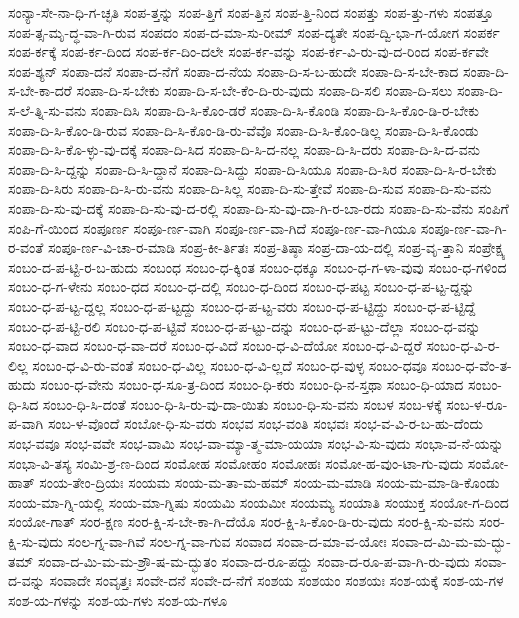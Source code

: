 {ಸಂನ್ಯಾ-ಸೇ-ನಾ-ಧಿ-ಗ-ಚ್ಛತಿ
ಸಂಪ-ತ್ತನ್ನು
ಸಂಪ-ತ್ತಿಗೆ
ಸಂಪ-ತ್ತಿನ
ಸಂಪ-ತ್ತಿ-ನಿಂದ
ಸಂಪತ್ತು
ಸಂಪ-ತ್ತು-ಗಳು
ಸಂಪತ್ತೂ
ಸಂಪ-ತ್ಸ-ಮೃ-ದ್ಧ-ವಾ-ಗಿ-ರುವ
ಸಂಪದಂ
ಸಂಪ-ದ-ಮಾ-ಸು-ರೀಮ್
ಸಂಪ-ದ್ಯತೇ
ಸಂಪ-ದ್ವಿ-ಭಾ-ಗ-ಯೋಗ
ಸಂಪರ್ಕ
ಸಂಪ-ರ್ಕಕ್ಕೆ
ಸಂಪ-ರ್ಕ-ದಿಂದ
ಸಂಪ-ರ್ಕ-ದಿಂ-ದಲೇ
ಸಂಪ-ರ್ಕ-ವನ್ನು
ಸಂಪ-ರ್ಕ-ವಿ-ರು-ವು-ದ-ರಿಂದ
ಸಂಪ-ರ್ಕವೇ
ಸಂಪ-ಶ್ಯನ್
ಸಂಪಾ-ದನೆ
ಸಂಪಾ-ದ-ನೆಗೆ
ಸಂಪಾ-ದ-ನೆಯ
ಸಂಪಾ-ದಿ-ಸ-ಬ-ಹುದೇ
ಸಂಪಾ-ದಿ-ಸ-ಬೇ-ಕಾದ
ಸಂಪಾ-ದಿ-ಸ-ಬೇ-ಕಾ-ದರೆ
ಸಂಪಾ-ದಿ-ಸ-ಬೇಕು
ಸಂಪಾ-ದಿ-ಸ-ಬೇ-ಕೆಂ-ದಿ-ರು-ವುದು
ಸಂಪಾ-ದಿ-ಸಲಿ
ಸಂಪಾ-ದಿ-ಸಲು
ಸಂಪಾ-ದಿ-ಸ-ಲೆ-ತ್ನಿ-ಸು-ವನು
ಸಂಪಾ-ದಿಸಿ
ಸಂಪಾ-ದಿ-ಸಿ-ಕೊಂ-ಡರೆ
ಸಂಪಾ-ದಿ-ಸಿ-ಕೊಂಡಿ
ಸಂಪಾ-ದಿ-ಸಿ-ಕೊಂ-ಡಿ-ರ-ಬೇಕು
ಸಂಪಾ-ದಿ-ಸಿ-ಕೊಂ-ಡಿ-ರುವ
ಸಂಪಾ-ದಿ-ಸಿ-ಕೊಂ-ಡಿ-ರು-ವೆವೊ
ಸಂಪಾ-ದಿ-ಸಿ-ಕೊಂ-ಡಿಲ್ಲ
ಸಂಪಾ-ದಿ-ಸಿ-ಕೊಂಡು
ಸಂಪಾ-ದಿ-ಸಿ-ಕೊ-ಳ್ಳು-ವು-ದಕ್ಕೆ
ಸಂಪಾ-ದಿ-ಸಿದ
ಸಂಪಾ-ದಿ-ಸಿ-ದ-ನಲ್ಲ
ಸಂಪಾ-ದಿ-ಸಿ-ದರು
ಸಂಪಾ-ದಿ-ಸಿ-ದ-ವನು
ಸಂಪಾ-ದಿ-ಸಿ-ದ್ದನ್ನು
ಸಂಪಾ-ದಿ-ಸಿ-ದ್ದಾನೆ
ಸಂಪಾ-ದಿ-ಸಿದ್ದು
ಸಂಪಾ-ದಿ-ಸಿಯೂ
ಸಂಪಾ-ದಿ-ಸಿರ
ಸಂಪಾ-ದಿ-ಸಿ-ರ-ಬೇಕು
ಸಂಪಾ-ದಿ-ಸಿರು
ಸಂಪಾ-ದಿ-ಸಿ-ರು-ವನು
ಸಂಪಾ-ದಿ-ಸಿಲ್ಲ
ಸಂಪಾ-ದಿ-ಸು-ತ್ತೇವೆ
ಸಂಪಾ-ದಿ-ಸುವ
ಸಂಪಾ-ದಿ-ಸು-ವನು
ಸಂಪಾ-ದಿ-ಸು-ವು-ದಕ್ಕೆ
ಸಂಪಾ-ದಿ-ಸು-ವು-ದ-ರಲ್ಲಿ
ಸಂಪಾ-ದಿ-ಸು-ವು-ದಾ-ಗಿ-ರ-ಬಾ-ರದು
ಸಂಪಾ-ದಿ-ಸು-ವೆನು
ಸಂಪಿಗೆ
ಸಂಪಿ-ಗೆ-ಯಿಂದ
ಸಂಪೂರ್ಣ
ಸಂಪೂ-ರ್ಣ-ವಾಗಿ
ಸಂಪೂ-ರ್ಣ-ವಾ-ಗಿದೆ
ಸಂಪೂ-ರ್ಣ-ವಾ-ಗಿಯೂ
ಸಂಪೂ-ರ್ಣ-ವಾ-ಗಿ-ರ-ವಂತೆ
ಸಂಪೂ-ರ್ಣ-ವಿ-ಚಾ-ರ-ಮಾಡಿ
ಸಂಪ್ರ-ಕೀ-ರ್ತಿತಃ
ಸಂಪ್ರ-ತಿಷ್ಠಾ
ಸಂಪ್ರ-ದಾ-ಯ-ದಲ್ಲಿ
ಸಂಪ್ರ-ವೃ-ತ್ತಾನಿ
ಸಂಪ್ರೇಕ್ಷ್ಯ
ಸಂಬಂ-ದ-ಪ-ಟ್ಟಿ-ರ-ಬ-ಹುದು
ಸಂಬಂಧ
ಸಂಬಂ-ಧ-ಕ್ಕಿಂತ
ಸಂಬಂ-ಧಕ್ಕೂ
ಸಂಬಂ-ಧ-ಗ-ಳಾ-ವುವು
ಸಂಬಂ-ಧ-ಗಳಿಂದ
ಸಂಬಂ-ಧ-ಗ-ಳೇನು
ಸಂಬಂ-ಧದ
ಸಂಬಂ-ಧ-ದಲ್ಲಿ
ಸಂಬಂ-ಧ-ದಿಂದ
ಸಂಬಂ-ಧ-ಪಟ್ಟ
ಸಂಬಂ-ಧ-ಪ-ಟ್ಟ-ದ್ದನ್ನು
ಸಂಬಂ-ಧ-ಪ-ಟ್ಟ-ದ್ದಲ್ಲ
ಸಂಬಂ-ಧ-ಪ-ಟ್ಟದ್ದು
ಸಂಬಂ-ಧ-ಪ-ಟ್ಟ-ವರು
ಸಂಬಂ-ಧ-ಪ-ಟ್ಟಿದ್ದು
ಸಂಬಂ-ಧ-ಪ-ಟ್ಟಿದ್ದೆ
ಸಂಬಂ-ಧ-ಪ-ಟ್ಟಿ-ರಲಿ
ಸಂಬಂ-ಧ-ಪ-ಟ್ಟಿವೆ
ಸಂಬಂ-ಧ-ಪ-ಟ್ಟು-ದನ್ನು
ಸಂಬಂ-ಧ-ಪ-ಟ್ಟು-ದೆಲ್ಲಾ
ಸಂಬಂ-ಧ-ವನ್ನು
ಸಂಬಂ-ಧ-ವಾದ
ಸಂಬಂ-ಧ-ವಾ-ದರೆ
ಸಂಬಂ-ಧ-ವಿದೆ
ಸಂಬಂ-ಧ-ವಿ-ದೆಯೋ
ಸಂಬಂ-ಧ-ವಿ-ದ್ದರೆ
ಸಂಬಂ-ಧ-ವಿ-ರ-ಲಿಲ್ಲ
ಸಂಬಂ-ಧ-ವಿ-ರು-ವಂತೆ
ಸಂಬಂ-ಧ-ವಿಲ್ಲ
ಸಂಬಂ-ಧ-ವಿ-ಲ್ಲದೆ
ಸಂಬಂ-ಧ-ವುಳ್ಳ
ಸಂಬಂ-ಧವೂ
ಸಂಬಂ-ಧ-ವೆಂ-ತ-ಹುದು
ಸಂಬಂ-ಧ-ವೇನು
ಸಂಬಂ-ಧ-ಸೂ-ತ್ರ-ದಿಂದ
ಸಂಬಂ-ಧಿ-ಕರು
ಸಂಬಂ-ಧಿ-ನ-ಸ್ತಥಾ
ಸಂಬಂ-ಧಿ-ಯಾದ
ಸಂಬಂ-ಧಿ-ಸಿದ
ಸಂಬಂ-ಧಿ-ಸಿ-ದಂತೆ
ಸಂಬಂ-ಧಿ-ಸಿ-ರು-ವು-ದಾ-ಯಿತು
ಸಂಬಂ-ಧಿ-ಸು-ವನು
ಸಂಬಳ
ಸಂಬ-ಳಕ್ಕೆ
ಸಂಬ-ಳ-ರೂ-ಪ-ವಾಗಿ
ಸಂಬ-ಳ-ವೊಂದೆ
ಸಂಬೋ-ಧಿ-ಸು-ವರು
ಸಂಭವ
ಸಂಭ-ವಂತಿ
ಸಂಭವಃ
ಸಂಭ-ವ-ವಿ-ರ-ಬ-ಹು-ದೆಂದು
ಸಂಭ-ವವೂ
ಸಂಭ-ವವೇ
ಸಂಭ-ವಾಮಿ
ಸಂಭ-ವಾ-ಮ್ಯಾ-ತ್ಮ-ಮಾ-ಯಯಾ
ಸಂಭ-ವಿ-ಸು-ವುದು
ಸಂಭಾ-ವ-ನೆ-ಯನ್ನು
ಸಂಭಾ-ವಿ-ತಸ್ಯ
ಸಂಮಿ-ಶ್ರ-ಣ-ದಿಂದ
ಸಂಮೋಹ
ಸಂಮೋಹಂ
ಸಂಮೋಹಃ
ಸಂಮೋ-ಹ-ವುಂ-ಟಾ-ಗು-ವುದು
ಸಂಮೋ-ಹಾತ್
ಸಂಯ-ತೇಂ-ದ್ರಿಯಃ
ಸಂಯಮ
ಸಂಯ-ಮ-ತಾ-ಮ-ಹಮ್
ಸಂಯ-ಮ-ಮಾಡಿ
ಸಂಯ-ಮ-ಮಾ-ಡಿ-ಕೊಂಡು
ಸಂಯ-ಮಾ-ಗ್ನಿ-ಯಲ್ಲಿ
ಸಂಯ-ಮಾ-ಗ್ನಿಷು
ಸಂಯಮಿ
ಸಂಯಮೀ
ಸಂಯಮ್ಯ
ಸಂಯಾತಿ
ಸಂಯುಕ್ತ
ಸಂಯೋ-ಗ-ದಿಂದ
ಸಂಯೋ-ಗಾತ್
ಸಂರ-ಕ್ಷಣ
ಸಂರ-ಕ್ಷಿ-ಸ-ಬೇ-ಕಾ-ಗಿ-ದೆಯೊ
ಸಂರ-ಕ್ಷಿ-ಸಿ-ಕೊಂ-ಡಿ-ರು-ವುದು
ಸಂರ-ಕ್ಷಿ-ಸು-ವನು
ಸಂರ-ಕ್ಷಿ-ಸು-ವುದು
ಸಂಲ-ಗ್ನ-ವಾ-ಗಿವೆ
ಸಂಲ-ಗ್ನ-ವಾ-ಗುವ
ಸಂವಾದ
ಸಂವಾ-ದ-ಮಾ-ವ-ಯೋಃ
ಸಂವಾ-ದ-ಮಿ-ಮ-ಮ-ದ್ಭು-ತಮ್
ಸಂವಾ-ದ-ಮಿ-ಮ-ಮ-ಶ್ರೌ-ಷ-ಮ-ದ್ಭುತಂ
ಸಂವಾ-ದ-ರೂ-ಪದ್ದು
ಸಂವಾ-ದ-ರೂ-ಪ-ವಾ-ಗಿ-ರು-ವುದು
ಸಂವಾ-ದ-ವನ್ನು
ಸಂವಾದೇ
ಸಂವೃತ್ತಃ
ಸಂವೇ-ದನೆ
ಸಂವೇ-ದ-ನೆಗೆ
ಸಂಶಯ
ಸಂಶಯಂ
ಸಂಶಯಃ
ಸಂಶ-ಯಕ್ಕೆ
ಸಂಶ-ಯ-ಗಳ
ಸಂಶ-ಯ-ಗಳನ್ನು
ಸಂಶ-ಯ-ಗಳು
ಸಂಶ-ಯ-ಗಳೂ
}
